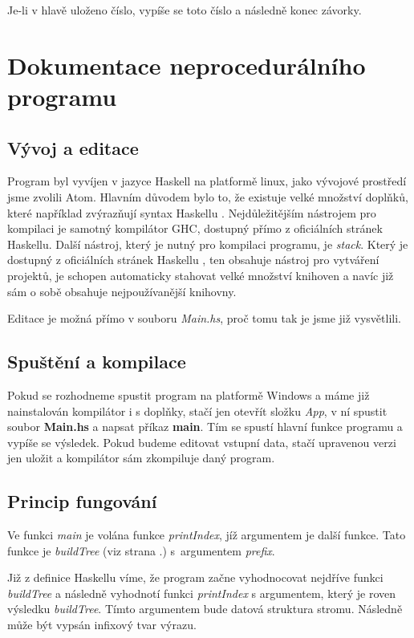 \documentclass[12pt,a4paper]{report}
\begin{document}
Je-li v hlavě uloženo číslo, vypíše se toto číslo a následně konec závorky.
\newpage
\section{Dokumentace neprocedurálního programu}
\subsection{Vývoj a editace}
Program byl vyvíjen v jazyce Haskell na platformě linux, jako vývojové prostředí jsme zvolili Atom. Hlavním důvodem bylo to, že existuje velké množství doplňků, které například zvýrazňují syntax Haskellu \cite{stack}. Nejdůležitějším nástrojem pro kompilaci je samotný kompilátor GHC, dostupný přímo z oficiálních stránek Haskellu. Další nástroj, který je nutný pro kompilaci programu, je \textit{stack}. Který je dostupný z oficiálních stránek Haskellu \cite{stack}, ten obsahuje nástroj pro vytváření projektů, je schopen automaticky stahovat velké množství knihoven a navíc již sám o sobě obsahuje nejpoužívanější knihovny.
 
Editace je možná přímo v souboru \textit{Main.hs}, proč tomu tak je jsme již vysvětlili.  

\subsection{Spuštění a kompilace}
Pokud se rozhodneme spustit program na platformě Windows a máme již nainstalován kompilátor i s doplňky, stačí jen otevřít složku \textit{App}, v ní spustit soubor \textbf{Main.hs} a napsat příkaz \textbf{main}. Tím se spustí hlavní funkce programu a vypíše se výsledek. Pokud budeme editovat vstupní data, stačí upravenou verzi jen uložit a kompilátor sám zkompiluje daný program. 
 
\subsection{Princip fungování}
Ve funkci \textit{main} je volána funkce \textit{printIndex}, jíž argumentem je další funkce. Tato funkce je \textit{buildTree} (viz strana \pageref{buildTree}.) s~argumentem \textit{prefix}.

Již z definice Haskellu víme, že program začne vyhodnocovat nejdříve funkci \textit{buildTree} a následně vyhodnotí funkci \textit{printIndex} s argumentem, který je roven výsledku \textit{buildTree}. Tímto argumentem bude datová struktura stromu. Následně může být vypsán infixový tvar výrazu.  
\end{document}
